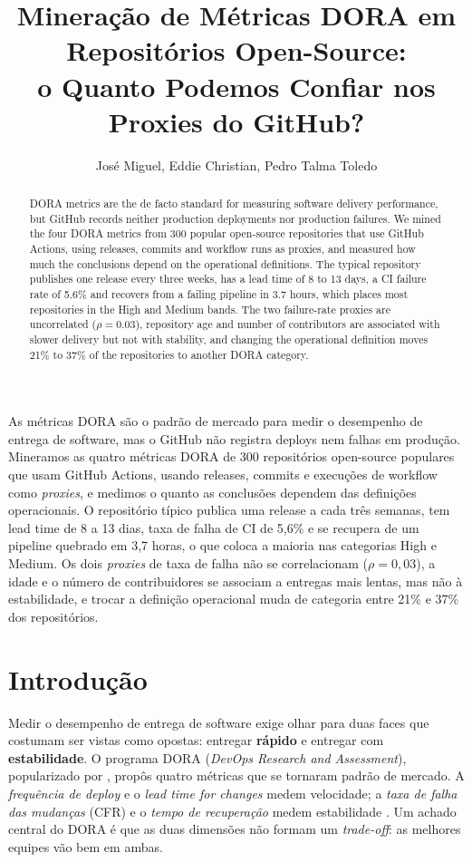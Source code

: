 \documentclass[12pt]{article}
\title{Mineração de Métricas DORA em Repositórios Open-Source:\\
o Quanto Podemos Confiar nos Proxies do GitHub?}
\author{José Miguel\inst{1}, Eddie Christian\inst{1}, Pedro Talma Toledo\inst{1}}
\begin{document}
\maketitle

\begin{abstract}
DORA metrics are the de facto standard for measuring software delivery performance,
but GitHub records neither production deployments nor production failures. We mined
the four DORA metrics from 300 popular open-source repositories that use GitHub
Actions, using releases, commits and workflow runs as proxies, and measured how much
the conclusions depend on the operational definitions. The typical repository
publishes one release every three weeks, has a lead time of 8 to 13 days, a CI
failure rate of 5.6\% and recovers from a failing pipeline in 3.7 hours, which places
most repositories in the High and Medium bands. The two failure-rate proxies are
uncorrelated ($\rho = 0.03$), repository age and number of contributors are associated
with slower delivery but not with stability, and changing the operational definition
moves 21\% to 37\% of the repositories to another DORA category.
\end{abstract}

\begin{resumo}
As métricas DORA são o padrão de mercado para medir o desempenho de entrega de
software, mas o GitHub não registra deploys nem falhas em produção. Mineramos as
quatro métricas DORA de 300 repositórios open-source populares que usam GitHub
Actions, usando releases, commits e execuções de workflow como \textit{proxies}, e
medimos o quanto as conclusões dependem das definições operacionais. O repositório
típico publica uma release a cada três semanas, tem lead time de 8 a 13 dias, taxa
de falha de CI de 5,6\% e se recupera de um pipeline quebrado em 3,7 horas, o que
coloca a maioria nas categorias High e Medium. Os dois \textit{proxies} de taxa de
falha não se correlacionam ($\rho = 0{,}03$), a idade e o número de contribuidores se
associam a entregas mais lentas, mas não à estabilidade, e trocar a definição
operacional muda de categoria entre 21\% e 37\% dos repositórios.
\end{resumo}

\section{Introdução}

Medir o desempenho de entrega de software exige olhar para duas faces que costumam
ser vistas como opostas: entregar \textbf{rápido} e entregar com \textbf{estabilidade}.
O programa DORA (\textit{DevOps Research and Assessment}), popularizado por
\cite{forsgren2018}, propôs quatro métricas que se tornaram padrão de mercado. A
\textit{frequência de deploy} e o \textit{lead time for changes} medem velocidade; a
\textit{taxa de falha das mudanças} (CFR) e o \textit{tempo de recuperação} medem
estabilidade \cite{dora2024}. Um achado central do DORA é que as duas dimensões não
formam um \textit{trade-off}: as melhores equipes vão bem em ambas.
\end{document}
